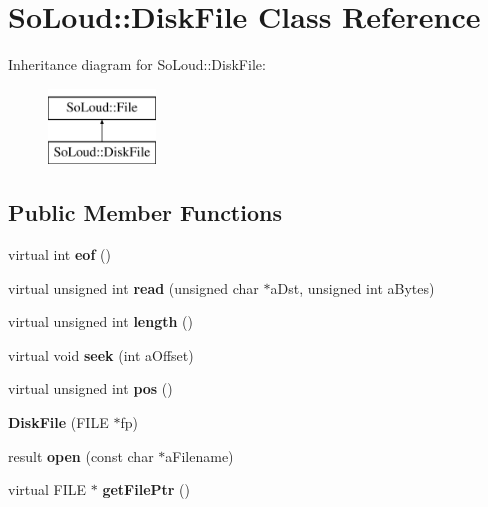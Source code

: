 \hypertarget{class_so_loud_1_1_disk_file}{}\section{So\+Loud\+::Disk\+File Class Reference}
\label{class_so_loud_1_1_disk_file}
Inheritance diagram for So\+Loud\+::Disk\+File\+:\begin{figure}[H]
\begin{center}
\leavevmode
\includegraphics[height=2.000000cm]{class_so_loud_1_1_disk_file}
\end{center}
\end{figure}
\subsection*{Public Member Functions}
\begin{DoxyCompactItemize}
\item 
\mbox{\label{class_so_loud_1_1_disk_file_aee7ed758cc7e6f5c81d2f141c88f9ef1}} 
virtual int {\bfseries eof} ()
\item 
\mbox{\label{class_so_loud_1_1_disk_file_a9fb3423e7301fb866f066e17bf1dc287}} 
virtual unsigned int {\bfseries read} (unsigned char $\ast$a\+Dst, unsigned int a\+Bytes)
\item 
\mbox{\label{class_so_loud_1_1_disk_file_a5b5bf84d8c1b3c53258a77674279b5c8}} 
virtual unsigned int {\bfseries length} ()
\item 
\mbox{\label{class_so_loud_1_1_disk_file_a674680dfc08f7e209e5c342c15185610}} 
virtual void {\bfseries seek} (int a\+Offset)
\item 
\mbox{\label{class_so_loud_1_1_disk_file_adbfe88b1bcfc9a8e20789c6f043b1adc}} 
virtual unsigned int {\bfseries pos} ()
\item 
\mbox{\label{class_so_loud_1_1_disk_file_a3fccd8c6ebc72661af188bd04c490178}} 
{\bfseries Disk\+File} (F\+I\+LE $\ast$fp)
\item 
\mbox{\label{class_so_loud_1_1_disk_file_ae9f3fc6d8b13f91fa1d9f4136a4643a4}} 
result {\bfseries open} (const char $\ast$a\+Filename)
\item 
\mbox{\label{class_so_loud_1_1_disk_file_aca65efd2840677b0091de829bb4fa8b8}} 
virtual F\+I\+LE $\ast$ {\bfseries get\+File\+Ptr} ()
\end{DoxyCompactItemize}
